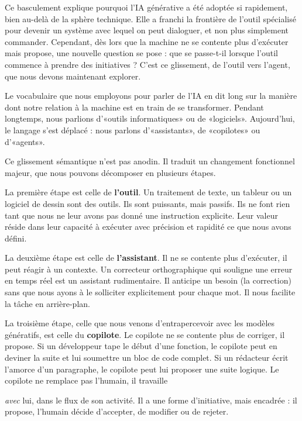 Ce basculement explique pourquoi l'IA générative a été adoptée si rapidement, bien au-delà de la sphère technique. Elle a franchi la frontière de l'outil spécialisé pour devenir un système avec lequel on peut dialoguer, et non plus simplement commander. Cependant, dès lors que la machine ne se contente plus d'exécuter mais propose, une nouvelle question se pose : que se passe-t-il lorsque l'outil commence à prendre des initiatives ? C'est ce glissement, de l'outil vers l'agent, que nous devons maintenant explorer.


Le vocabulaire que nous employons pour parler de l'IA en dit long sur la manière dont notre relation à la machine est en train de se transformer. Pendant longtemps, nous parlions d'«outils informatiques» ou de «logiciels». Aujourd'hui, le langage s'est déplacé : nous parlons d'«assistants», de «copilotes» ou d'«agents».

Ce glissement sémantique n'est pas anodin. Il traduit un changement fonctionnel majeur, que nous pouvons décomposer en plusieurs étapes.

La première étape est celle de \textbf{l'outil}. Un traitement de texte, un tableur ou un logiciel de dessin sont des outils. Ils sont puissants, mais passifs. Ils ne font rien tant que nous ne leur avons pas donné une instruction explicite. Leur valeur réside dans leur capacité à exécuter avec précision et rapidité ce que nous avons défini.

La deuxième étape est celle de \textbf{l'assistant}. Il ne se contente plus d'exécuter, il peut réagir à un contexte. Un correcteur orthographique qui souligne une erreur en temps réel est un assistant rudimentaire. Il anticipe un besoin (la correction) sans que nous ayons à le solliciter explicitement pour chaque mot. Il nous facilite la tâche en arrière-plan.

La troisième étape, celle que nous venons d'entrapercevoir avec les modèles génératifs, est celle du \textbf{copilote}. Le copilote ne se contente plus de corriger, il propose. Si un développeur tape le début d'une fonction, le copilote peut en deviner la suite et lui soumettre un bloc de code complet. Si un rédacteur écrit l'amorce d'un paragraphe, le copilote peut lui proposer une suite logique. Le copilote ne remplace pas l'humain, il travaille

\emph{avec} lui, dans le flux de son activité. Il a une forme d'initiative, mais encadrée : il propose, l'humain décide d'accepter, de modifier ou de rejeter.

